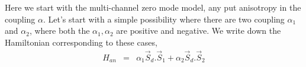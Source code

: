 \documentclass[reprint,prb,superscriptaddress]{revtex4-2}
\begin{document}
Here we start with the multi-channel zero mode model, any put anisotropy in the coupling $\alpha$. Let's start with a simple possibility where there are two coupling $\alpha_1$ and $\alpha_2$, where both the $\alpha_1,\alpha_2$ are positive and negative. We write down the Hamiltonian corresponding to these cases,
\begin{eqnarray}
H_{an}&=& \alpha_1 \vec{S}_d.\vec{S}_1 + \alpha_2 \vec{S}_d.\vec{S}_2 %
\end{eqnarray}
%
%
%
%
\end{document}
